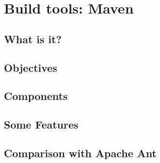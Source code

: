\section{Build tools: Maven}

\subsection{What is it?}

\subsection{Objectives}

\subsection{Components}

\subsection{Some Features}

\subsection{Comparison with Apache Ant}
